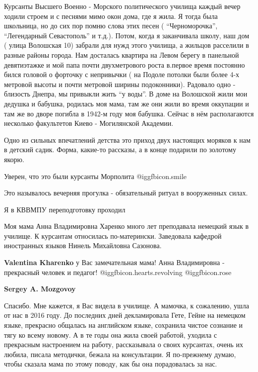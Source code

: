 \begin{itemize}
Курсанты Высшего Военно - Морского политического училища каждый вечер ходили
строем и с песнями мимо окон дома, где я жила. Я тогда была школьница, но до
сих пор помню слова этих песен ( \enquote{Черноморочка}, \enquote{Легендарный Севастополь} и
т.д.). Потом, когда я заканчивала школу, наш дом ( улица Волошская 10) забрали
для нужд этого училища, а жильцов расселили в разные районы города. Нам
досталась квартира на Левом берегу в панельной девятиэтажке и мой папа почти
двухметрового роста в.первое время постоянно бился головой о форточку с
непривычки ( на Подоле потолки были более 4-х метровой высоты и почти метровой
ширины подоконники). Радовало одно - близость Днепра, мы привыкли жить \enquote{у
воды}. В доме на Волошской жили мои дедушка и бабушка, родилась моя мама, там
же они жили во время оккупации и там же во дворе погибла в 1942-м году моя
бабушка. Сейчас в нём располагаются несколько факультетов Киево - Могилянской
Академии.


Одно из сильных впечатлений детства это приход двух настоящих моряков к нам в
детский садик. Форма, какие-то рассказы, а в конце подарили по золотому якорю.

Уверен, что это были курсанты Морполита  @igg{fbicon.smile} 

Это называлось вечерняя прогулка - обязательный ритуал в вооруженных силах.

Я в КВВМПУ переподготовку проходил


Моя мама Анна Владимировна Харенко много лет преподавала немецкий язык в
училище. К курсантам относилась по-матерински. Заведовала кафедрой иностранных
языков Нинель Михайловна Сазонова.

\begin{itemize} %
\textbf{Valentina Kharenko} у Вас замечательная мама! Анна Владимировна - прекрасный человек и педагог!  @igg{fbicon.hearts.revolving}  @igg{fbicon.rose} 

\textbf{Sergey A. Mozgovoy} 

Спасибо. Мне кажется, я Вас видела в училище. А мамочка, к сожалению, ушла от
нас в 2016 году. До последних дней декламировала Гете, Гейне на немецком языке,
прекрасно общалась на английском языке, сохранила чистое сознание и тягу ко
всему новому. А в те годы она жила своей работой, уходила с прекрасным
настроением на работу, рассказывала о своих курсантах, очень их любила, писала
методички, бежала на консультации. Я по-прежнему думаю, чтобы сказала мама по
этому поводу, как бы она порадовалась за нас.



\end{itemize}
\end{itemize}
